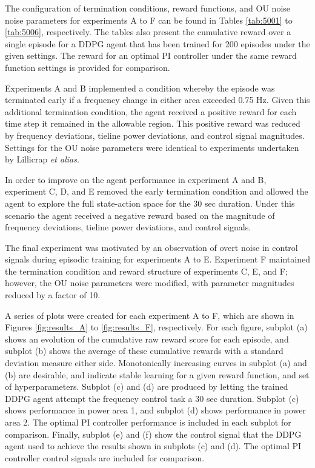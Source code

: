 The configuration of termination conditions, reward functions, and OU noise noise parameters for experiments A to F can be found in Tables \ref{tab:5001} to \ref{tab:5006}, respectively. The tables also present the cumulative reward over a single episode for a DDPG agent that has been trained for 200 episodes under the given settings. The reward for an optimal PI controller under the same reward function settings is provided for comparison. 

Experiments A and B implemented a condition whereby the episode was terminated early if a frequency change in either area exceeded 0.75 Hz. Given this additional termination condition, the agent received a positive reward for each time step it remained in the allowable region. This positive reward was reduced by frequency deviations, tieline power deviations, and control signal magnitudes. Settings for the OU noise parameters were identical to experiments undertaken by Lillicrap \textit{et alias}.

In order to improve on the agent performance in experiment A and B, experiment C, D, and E removed the early termination condition and allowed the agent to explore the full state-action space for the 30 sec duration. Under this scenario the agent received a negative reward based on the magnitude of frequency deviations, tieline power deviations, and control signals.

The final experiment was motivated by an observation of overt noise in control signals during episodic training for experiments A to E. Experiment F maintained the termination condition and reward structure of experiments C, E, and F; however, the OU noise parameters were modified, with parameter magnitudes reduced by a factor of 10.

A series of plots were created for each experiment A to F, which are shown in Figures \ref{fig:results_A} to \ref{fig:results_F}, respectively. For each figure, subplot (a) shows an evolution of the cumulative raw reward score for each episode, and subplot (b) shows the average of these cumulative rewards with a standard deviation measure either side. Monotonically increasing curves in subplot (a) and (b) are desirable, and indicate stable learning for a given reward function, and set of hyperparameters. Subplot (c) and (d) are produced by letting the trained DDPG agent attempt the frequency control task a 30 sec duration. Subplot (c) shows performance in power area 1, and subplot (d) shows performance in power area 2. The optimal PI controller performance is included in each subplot for comparison. Finally, subplot (e) and (f) show the control signal that the DDPG agent used to achieve the results shown in subplots (c) and (d). The optimal PI controller control signals are included for comparison.


